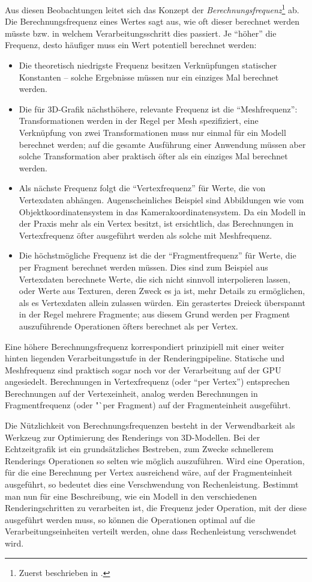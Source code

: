 \documentclass[twoside,a4paper,fleqn,12pt]{article}
\begin{document}
Aus diesen Beobachtungen leitet sich das Konzept der \emph{Berechnungsfrequenz}\footnote{Zuerst beschrieben in \cite{stanford_rtsl}.} ab.
Die Berechnungsfrequenz eines Wertes sagt aus, wie oft dieser berechnet werden müsste bzw. in welchem Verarbeitungsschritt
dies passiert. Je "`höher"' die Frequenz, desto häufiger muss ein Wert potentiell berechnet werden:
\begin{itemize}
\item Die theoretisch niedrigste Frequenz besitzen Verknüpfungen statischer Konstanten -- solche Ergebnisse müssen nur ein einziges Mal berechnet werden.
\item Die für 3D-Grafik nächsthöhere, relevante Frequenz ist die "`Meshfrequenz"': Transformationen werden in der Regel per Mesh spezifiziert,
eine Verknüpfung von zwei Transformationen muss nur einmal für ein Modell berechnet werden; auf die gesamte Ausführung einer Anwendung
müssen aber solche Transformation aber praktisch öfter als ein einziges Mal berechnet werden.
\item Als nächste Frequenz folgt die "`Vertexfrequenz"' für Werte, die von Vertexdaten abhängen. Augenscheinliches Beispiel sind Abbildungen
wie vom Objektkoordinatensystem in das Kamerakoordinatensystem. Da ein Modell in der Praxis mehr als ein Vertex besitzt,
ist ersichtlich, das Berechnungen in Vertexfrequenz öfter ausgeführt werden als solche mit Meshfrequenz.
\item Die höchstmögliche Frequenz ist die der "`Fragmentfrequenz"' für Werte, die per Fragment berechnet werden müssen.
Dies sind zum Beispiel aus Vertexdaten berechnete Werte, die sich nicht sinnvoll interpolieren lassen, oder Werte aus Texturen,
deren Zweck es ja ist, mehr Details zu ermöglichen, als es Vertexdaten allein zulassen würden.
Ein gerastertes Dreieck überspannt in der Regel mehrere Fragmente; aus diesem Grund werden per Fragment auszuführende Operationen
öfters berechnet als per Vertex.
\end{itemize}

Eine höhere Berechnungsfrequenz korrespondiert prinzipiell mit einer weiter hinten liegenden Verarbeitungsstufe in der Renderingpipeline.
Statische und Meshfrequenz sind praktisch sogar noch vor der Verarbeitung auf der GPU angesiedelt. Berechnungen in Vertexfrequenz (oder "`per Vertex"')
entsprechen Berechnungen auf der Vertexeinheit, analog werden Berechnungen in Fragmentfrequenz (oder "`per Fragment) auf der Fragmenteinheit ausgeführt.

Die Nützlichkeit von Berechnungsfrequenzen besteht in der Verwendbarkeit als Werkzeug zur Optimierung des Renderings von 3D-Modellen.
Bei der Echtzeitgrafik ist ein grundsätzliches Bestreben, zum Zwecke schnellerem Renderings Operationen so selten wie möglich auszuführen.
Wird eine Operation, für die eine Berechnung per Vertex ausreichend wäre, auf der Fragmenteinheit ausgeführt, so bedeutet dies
eine Verschwendung von Rechenleistung. Bestimmt man nun für eine Beschreibung, wie ein Modell in den verschiedenen Renderingschritten zu
verarbeiten ist, die Frequenz jeder Operation, mit der diese ausgeführt werden muss, so können die Operationen optimal auf die
Verarbeitungseinheiten verteilt werden, ohne dass Rechenleistung verschwendet wird.
\end{document}
